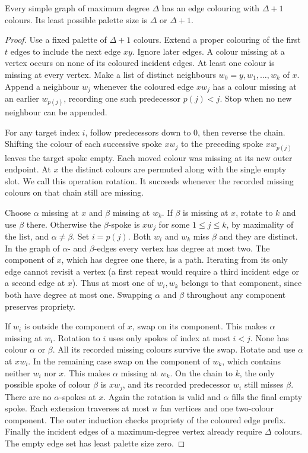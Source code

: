 \begin{theorem}[Vizing]\leavevmode\label{co:vizing}
Every simple graph of maximum degree $\Delta$ has an edge colouring with
$\Delta+1$ colours. Its least possible palette size is $\Delta$ or
$\Delta+1$.
\end{theorem}
\begin{proof}
Use a fixed palette of $\Delta+1$ colours. Extend a proper colouring of
the first $t$ edges to include the next edge $xy$. Ignore later edges.
A colour missing at a vertex occurs on none of its coloured incident
edges. At least one colour is missing at every vertex.
Make a list of distinct neighbours $w_0=y,w_1,\ldots,w_k$ of $x$.
Append a neighbour $w_j$ whenever the coloured edge $xw_j$ has a colour
missing at an earlier $w_{p(j)}$, recording one such predecessor $p(j)<j$.
Stop when no new neighbour can be appended.

For any target index $i$, follow predecessors down to $0$, then reverse
the chain. Shifting the colour of each successive spoke $xw_j$ to the
preceding spoke $xw_{p(j)}$ leaves the target spoke empty. Each moved
colour was missing at its new outer endpoint. At $x$ the distinct
colours are permuted along with the single empty slot. We call this
operation rotation. It succeeds whenever the recorded missing colours on
that chain still are missing.

Choose $\alpha$ missing at $x$ and $\beta$ missing at $w_k$.
If $\beta$ is missing at $x$, rotate to $k$ and use $\beta$ there.
Otherwise the $\beta$-spoke is $xw_j$ for some $1\le j\le k$, by
maximality of the list, and $\alpha\ne\beta$. Set $i=p(j)$. Both $w_i$
and $w_k$ miss $\beta$ and they are distinct. In the graph of
$\alpha$- and $\beta$-edges every vertex has degree at most two. The
component of $x$, which has degree one there, is a path. Iterating from its
only edge cannot revisit a vertex (a first repeat would require a third
incident edge or a second edge at $x$). Thus at most one of $w_i,w_k$
belongs to that component, since both have degree at most one. Swapping
$\alpha$ and $\beta$ throughout any component preserves propriety.

If $w_i$ is outside the component of $x$, swap on its component. This
makes $\alpha$ missing at $w_i$. Rotation to $i$ uses only spokes
of index at most $i<j$. None has colour $\alpha$ or $\beta$.
All its recorded missing colours survive the swap. Rotate and use
$\alpha$ at $xw_i$. In the remaining case swap on the component of
$w_k$, which contains neither $w_i$ nor $x$. This makes $\alpha$ missing
at $w_k$. On the chain to $k$, the only possible spoke of colour $\beta$
is $xw_j$, and its recorded predecessor $w_i$ still misses $\beta$.
There are no $\alpha$-spokes at $x$. Again the rotation is valid and
$\alpha$ fills the final empty spoke. Each extension traverses at most
$n$ fan vertices and one two-colour component. The outer induction checks
propriety of the coloured edge prefix. Finally the incident edges of a
maximum-degree vertex already require $\Delta$ colours. The empty edge
set has least palette size zero.
\end{proof}

